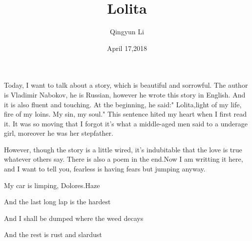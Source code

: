 \documentclass{article}
\author{Qingyun Li}
\date{April 17,2018}
\title{Lolita}
\begin{document}
\maketitle
\par Today, I want to talk about a story, which is beautiful and sorrowful. The author is Vladimir Nabokov, he is Russian, however he wrote this story in English. And it is also fluent and touching. At the beginning, he said:" Lolita,light of my life, fire of my loins. My sin, my soul." This sentence hited my heart when I first read it. It was so moving that I forgot it's what a middle-aged men said to a underage girl, moreover he was her stepfather.
\par However, though the story is a little wired, it's indubitable that the love is true whatever others say. There is also a poem in the end.Now I am writting it here, and I want to tell you, fearless is having fears but jumping anyway.
\par My car is limping, Dolores.Haze
\par And the last long lap is the hardest
\par And I shall be dumped where the weed decays
\par And the rest is rust and slardust
\end{document}
